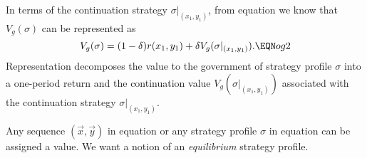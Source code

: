 
%

\medskip
In terms of the continuation strategy $\sigma\vert_{(x_1,y_1)}$,
from equation  we know that $V_g(\sigma)$ can be represented
as
$$ V_g(\sigma) = (1-\delta) r(x_1, y_1) + \delta V_g(\sigma\vert_{(x_1,
     y_1)}).   \EQN og2   $$
Representation  decomposes the value to the government of strategy
profile $\sigma$ into a one-period return and the continuation value
$V_g(\sigma\vert_{(x_1,y_1)})$ associated with the continuation
strategy $\sigma\vert_{(x_1,y_1)}$.

Any sequence $(\vec{x},\vec{y})$ in equation  or any strategy profile
$\sigma$ in equation  can be assigned a value.
We want a notion of an {\it equilibrium\/}  strategy profile.

